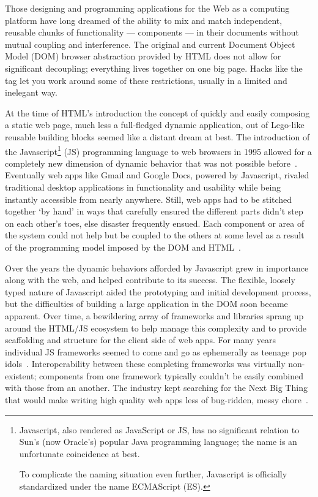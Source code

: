 Those designing and programming applications for the Web as a computing platform have long dreamed of the ability to mix and match independent, reusable chunks of functionality --- components --- in their documents without mutual coupling and interference. 
The original and current Document Object Model (DOM)
browser abstraction provided by HTML does not allow for significant decoupling; 
everything lives together on one big page. Hacks like the 
tag let you work around some of these restrictions, usually in a limited and inelegant way.

At the time of HTML's introduction the concept of quickly and easily composing a static web page, 
much less a full-fledged dynamic application, 
out of Lego-like reusable building blocks seemed like a distant dream at best. 
The introduction of the 
Javascript\footnote{Javascript, also rendered as JavaScript or JS, 
has no significant relation to Sun's (now Oracle's) popular Java programming language;
the name is an unfortunate coincidence at best.

To complicate the naming situation even further, Javascript is officially standardized under the name ECMAScript (ES).}
(JS) programming language to web browsers in 1995 allowed for a completely new dimension of dynamic behavior that was not possible before~\cite{w3ccontributors2012}.
Eventually web apps like Gmail and Google Docs, powered by Javascript, rivaled traditional desktop applications in functionality and usability while being instantly accessible from nearly anywhere.
Still, web apps had to be stitched together `by hand' in ways that carefully ensured the different parts didn't step on each other's toes, else disaster frequently ensued. 
Each component or area of the system could not help but be coupled to the others at some level as a result of the programming model imposed by the DOM and HTML~\cite{ihrig2012}.

Over the years the dynamic behaviors afforded by Javascript grew in importance along with the web, and helped contribute to its success. 
The flexible, loosely typed nature of Javascript aided the prototyping and initial development process,
but the difficulties of building a large application in the DOM soon became apparent.
Over time, a bewildering array of frameworks and libraries sprang up around the HTML/JS ecosystem to help manage this complexity and to provide scaffolding and structure for the client side of web apps.
For many years individual JS frameworks seemed to come and go as ephemerally as teenage pop idols~\cite{allenpike2015}. 
Interoperability between these completing frameworks was virtually non-existent; 
components from one framework typically couldn't be easily combined with those from an another.
The industry kept searching for the Next Big Thing that would make writing high quality web apps less of bug-ridden, messy chore~\cite{allenpike2015}. 

